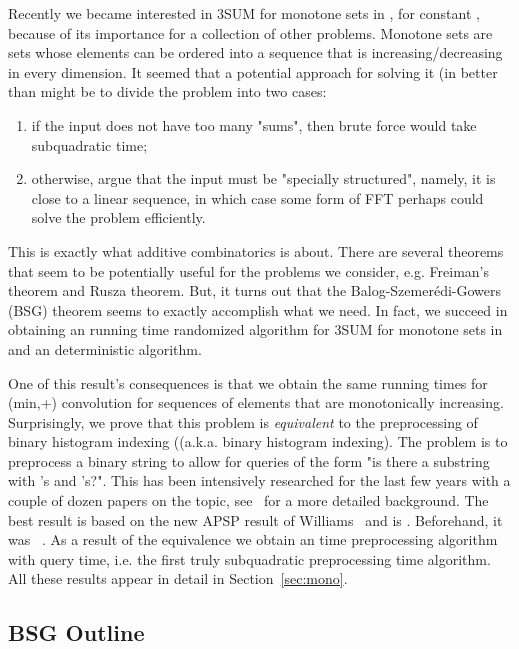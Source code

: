 \documentclass[11pt]{article}
\begin{document}
{Recently we became interested in 3SUM for monotone sets in , for constant , because of its importance for a collection of other problems. Monotone sets are sets whose elements can be ordered into a sequence that is increasing/decreasing in every dimension. It seemed that a potential approach for solving it (in better than  might be to divide the problem into two cases:

\begin{enumerate}
\item
if the input does not have too many "sums", then
   brute force would take subquadratic time;
\item
otherwise, argue that the input must be "specially structured",
   namely, it is close to a linear sequence, in which case some form of FFT perhaps could
   solve the problem efficiently.
\end{enumerate}

This is exactly what additive combinatorics is about. There are several theorems that seem to be potentially useful for the problems we consider, e.g. Freiman's theorem and Rusza theorem. But, it turns out that the Balog-Szemer\'{e}di-Gowers (BSG) theorem seems to exactly accomplish what we need. In fact, we succeed in obtaining an  running time randomized algorithm for 3SUM for monotone sets in  and an  deterministic algorithm.



One of this result's consequences is that we obtain the same running times for (min,+) convolution for sequences of elements  that are monotonically increasing. Surprisingly, we prove that this problem is {\em equivalent} to the preprocessing of binary histogram indexing ((a.k.a. binary histogram indexing). The problem is to preprocess a binary string to allow for queries of the form "is there a substring with 's and 's?". This has been intensively researched for the last few years with a couple of dozen papers on the topic, see~\cite{ACLL14} for a more detailed background. The best result is based on the new APSP result of Williams~\cite{Williams14} and is . Beforehand, it was ~\cite{}. As a result of the equivalence we obtain an  time preprocessing algorithm with  query time, i.e. the first truly subquadratic preprocessing time algorithm. All these results appear in detail in Section~\ref{sec:mono}.


\subsection{BSG Outline}


}
\end{document}
